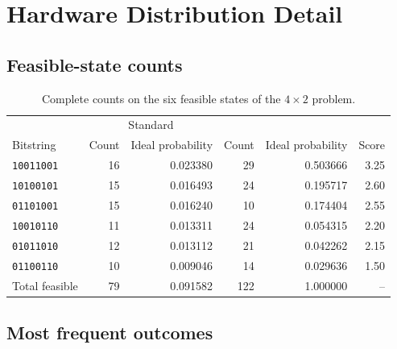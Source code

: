 \section{Hardware Distribution Detail}
\label{app:distributions}

\subsection{Feasible-state counts}

\begin{table}[H]
\centering
\caption{Complete counts on the six feasible states of the $4\times2$ problem.}
\small
\begin{tabular}{lrr|rr|r}
\toprule
 & \multicolumn{2}{c}{Standard \QAOA{}} & \multicolumn{2}{c}{\GMQAOA{}} & \\
Bitstring & Count & Ideal probability & Count & Ideal probability & Score\\
\midrule
\texttt{10011001} & 16 & 0.023380 & 29 & 0.503666 & 3.25\\
\texttt{10100101} & 15 & 0.016493 & 24 & 0.195717 & 2.60\\
\texttt{01101001} & 15 & 0.016240 & 10 & 0.174404 & 2.55\\
\texttt{10010110} & 11 & 0.013311 & 24 & 0.054315 & 2.20\\
\texttt{01011010} & 12 & 0.013112 & 21 & 0.042262 & 2.15\\
\texttt{01100110} & 10 & 0.009046 & 14 & 0.029636 & 1.50\\
\midrule
Total feasible & 79 & 0.091582 & 122 & 1.000000 & --\\
\bottomrule
\end{tabular}
\end{table}

\subsection{Most frequent outcomes}

